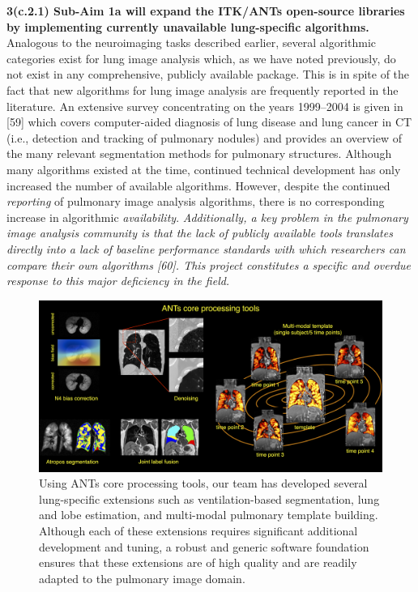 \documentclass[11pt,]{article}
\begin{document}
\textbf{3(c.2.1) Sub-Aim 1a will expand the ITK/ANTs open-source
libraries by implementing currently unavailable lung-specific
algorithms.} Analogous to the neuroimaging tasks described earlier,
several algorithmic categories exist for lung image analysis which, as
we have noted previously, do not exist in any comprehensive, publicly
available package. This is in spite of the fact that new algorithms for
lung image analysis are frequently reported in the literature. An
extensive survey concentrating on the years 1999--2004 is given in
{[}59{]} which covers computer-aided diagnosis of lung disease and lung
cancer in CT (i.e., detection and tracking of pulmonary nodules) and
provides an overview of the many relevant segmentation methods for
pulmonary structures. Although many algorithms existed at the time,
continued technical development has only increased the number of
available algorithms. However, despite the continued \emph{reporting} of
pulmonary image analysis algorithms, there is no corresponding increase
in algorithmic \emph{availability}. \emph{Additionally, a key problem in
the pulmonary image analysis community is that the lack of publicly
available tools translates directly into a lack of baseline performance
standards with which researchers can compare their own algorithms
{[}60{]}. This project constitutes a specific and overdue response to
this major deficiency in the field.}

\begin{figure}[htbp]
\centering
\includegraphics{Figs/coreANtsToolsLung.png}
\caption{Using ANTs core processing tools, our team has developed
several lung-specific extensions such as ventilation-based segmentation,
lung and lobe estimation, and multi-modal pulmonary template building.
Although each of these extensions requires significant additional
development and tuning, a robust and generic software foundation ensures
that these extensions are of high quality and are readily adapted to the
pulmonary image domain.}
\end{figure}
\end{document}
